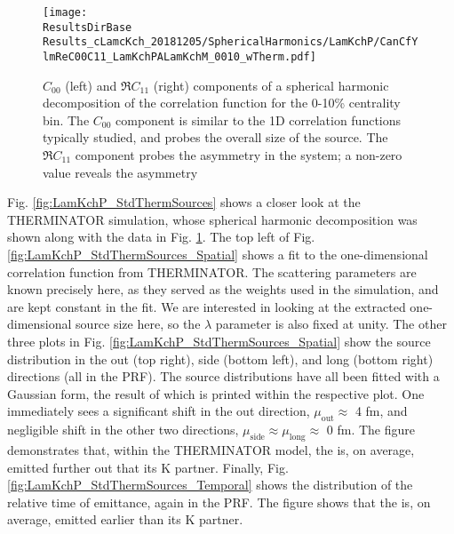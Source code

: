 \documentclass[/home/jesse/Analysis/FemtoAnalysis/AnalysisNotes/AnalysisNoteJBuxton.tex]{subfiles}
\begin{document}
\begin{figure}[h!]
  \centering
  \texttt{[image: \\ResultsDirBase Results\_cLamcKch\_20181205/SphericalHarmonics/LamKchP/CanCfYlmReC00C11\_LamKchPALamKchM\_0010\_wTherm.pdf]}
  \caption[\LamKchP $C_{00}$ and $\Re C_{11}$ Spherical Harmonic Components (0-10\%)]{$C_{00}$ (left) and $\Re C_{11}$ (right) components of a spherical harmonic decomposition of the \LamKchP correlation function for the 0-10\% centrality bin.  
The $C_{00}$ component is similar to the 1D correlation functions typically studied, and probes the overall size of the source.
The $\Re C_{11}$ component probes the asymmetry in the system; a non-zero value reveals the asymmetry}
  \label{fig:LamKchP_ReC00C11_0010}
\end{figure}


Fig. \ref{fig:LamKchP_StdThermSources} shows a closer look at the THERMINATOR simulation, whose spherical harmonic decomposition was shown along with the data in Fig. \ref{fig:LamKchP_ReC00C11_0010}.
The top left of Fig. \ref{fig:LamKchP_StdThermSources_Spatial} shows a fit to the one-dimensional correlation function from THERMINATOR.
The scattering parameters are known precisely here, as they served as the weights used in the simulation, and are kept constant in the fit.
We are interested in looking at the extracted one-dimensional source size here, so the $\lambda$ parameter is also fixed at unity.
The other three plots in Fig. \ref{fig:LamKchP_StdThermSources_Spatial} show the source distribution in the out (top right), side (bottom left), and long (bottom right) directions (all in the PRF).
The source distributions have all been fitted with a Gaussian form, the result of which is printed within the respective plot.
One immediately sees a significant shift in the out direction, $\mu_{\mathrm{out}} \approx$ 4 fm, and negligible shift in the other two directions, $\mu_{\mathrm{side}} \approx \mu_{\mathrm{long}} \approx$ 0 fm.
The figure demonstrates that, within the THERMINATOR model, the \Lam is, on average, emitted further out that its K partner.
Finally, Fig. \ref{fig:LamKchP_StdThermSources_Temporal} shows the distribution of the relative time of emittance, again in the PRF.
The figure shows that the \Lam is, on average, emitted earlier than its K partner.
\end{document}
